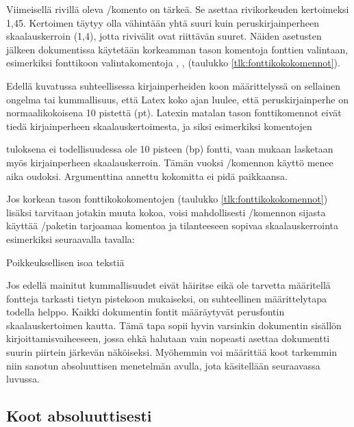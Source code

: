 Viimeisellä rivillä oleva \-/komento on tärkeä.
Se asettaa rivikorkeuden kertoimeksi 1,45. Kertoimen täytyy olla
vähintään yhtä suuri kuin peruskirjainperheen skaalauskerroin (1,4),
jotta rivivälit ovat riittävän suuret. Näiden asetusten jälkeen
dokumentissa käytetään korkeamman tason komentoja fonttien valintaan,
esimerkiksi fonttikoon valintakomentoja ,
,  (taulukko
\ref{tlk:fonttikokokomennot}).

Edellä kuvatussa suhteellisessa kirjainperheiden koon määrittelyssä on
sellainen ongelma tai kummallisuus, että Latex koko ajan luulee, että
peruskirjainperhe on normaalikokoisena 10 pistettä (pt). Latexin matalan
tason fonttikomennot eivät tiedä kirjainperheen skaalauskertoimesta, ja
siksi esimerkiksi komentojen

\begin{koodilohkosis}
  \fontsize{10bp}{12bp} \selectfont
\end{koodilohkosis}

tuloksena ei todellisuudessa ole 10 pisteen (bp) fontti, vaan mukaan
lasketaan myös kirjainperheen skaalauskerroin. Tämän vuoksi \-/komennon käyttö menee aika oudoksi. Argumenttina annettu
kokomitta ei pidä paikkaansa.

Jos korkean tason font\-ti\-koko\-komen\-to\-jen (taulukko
\ref{tlk:fonttikokokomennot}) lisäksi tarvitaan jotakin muuta kokoa,
voisi mahdollisesti \-/komennon sijasta käyttää
\-/paketin tarjoamaa komentoa ja tilanteeseen sopivaa
skaalauskerrointa esimerkiksi seuraavalla tavalla:

\begin{koodilohkosis}
  {Poikkeuksellisen isoa tekstiä}
\end{koodilohkosis}

Jos edellä mainitut kummallisuudet eivät häiritse eikä ole tarvetta
määritellä fontteja tarkasti tietyn pistekoon mukaiseksi, on
suhteellinen määrittelytapa todella helppo. Kaikki dokumentin fontit
määräytyvät perusfontin skaalauskertoimen kautta. Tämä tapa sopii hyvin
varsinkin dokumentin sisällön kirjoittamisvaiheeseen, jossa ehkä
halutaan vain nopeasti asettaa dokumentti suurin piirtein järkevän
näköiseksi. Myöhemmin voi määrittää koot tarkemmin niin sanotun
absoluuttisen menetelmän avulla, jota käsitellään seuraavassa luvussa.

\subsection{Koot absoluuttisesti}
\label{luku:fontti_absoluuttinen}

